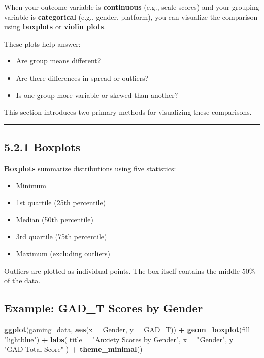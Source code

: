 \documentclass[
]{book}
\newenvironment{Shaded}{\begin{snugshade}}{\end{snugshade}}
\newcommand{\AttributeTok}[1]{\textcolor[rgb]{0.13,0.29,0.53}{#1}}
\newcommand{\FunctionTok}[1]{\textcolor[rgb]{0.13,0.29,0.53}{\textbf{#1}}}
\newcommand{\NormalTok}[1]{#1}
\newcommand{\SpecialCharTok}[1]{\textcolor[rgb]{0.81,0.36,0.00}{\textbf{#1}}}
\newcommand{\StringTok}[1]{\textcolor[rgb]{0.31,0.60,0.02}{#1}}
\providecommand{\tightlist}{%
  \setlength{\itemsep}{0pt}\setlength{\parskip}{0pt}}
\begin{document}
When your outcome variable is \textbf{continuous} (e.g., scale scores) and your grouping variable is \textbf{categorical} (e.g., gender, platform), you can visualize the comparison using \textbf{boxplots} or \textbf{violin plots}.

These plots help answer:

\begin{itemize}
\tightlist
\item
  Are group means different?
\item
  Are there differences in spread or outliers?
\item
  Is one group more variable or skewed than another?
\end{itemize}

This section introduces two primary methods for visualizing these comparisons.

\begin{center}\rule{0.5\linewidth}{0.5pt}\end{center}

\subsection{5.2.1 Boxplots}\label{boxplots}

\textbf{Boxplots} summarize distributions using five statistics:

\begin{itemize}
\tightlist
\item
  Minimum
\item
  1st quartile (25th percentile)
\item
  Median (50th percentile)
\item
  3rd quartile (75th percentile)
\item
  Maximum (excluding outliers)
\end{itemize}

Outliers are plotted as individual points. The box itself contains the middle 50\% of the data.

\subsection{Example: GAD\_T Scores by Gender}\label{example-gad_t-scores-by-gender}

\begin{Shaded}
\begin{Highlighting}[]
\FunctionTok{ggplot}\NormalTok{(gaming\_data, }\FunctionTok{aes}\NormalTok{(}\AttributeTok{x =}\NormalTok{ Gender, }\AttributeTok{y =}\NormalTok{ GAD\_T)) }\SpecialCharTok{+}
  \FunctionTok{geom\_boxplot}\NormalTok{(}\AttributeTok{fill =} \StringTok{"lightblue"}\NormalTok{) }\SpecialCharTok{+}
  \FunctionTok{labs}\NormalTok{(}
    \AttributeTok{title =} \StringTok{"Anxiety Scores by Gender"}\NormalTok{,}
    \AttributeTok{x =} \StringTok{"Gender"}\NormalTok{,}
    \AttributeTok{y =} \StringTok{"GAD Total Score"}
\NormalTok{  ) }\SpecialCharTok{+}
  \FunctionTok{theme\_minimal}\NormalTok{()}
\end{Highlighting}
\end{Shaded}
\end{document}
